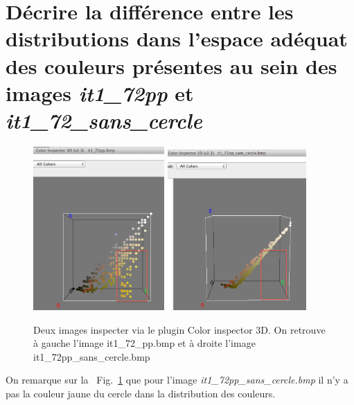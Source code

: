 \documentclass[a4paper,10pt]{article}
\begin{document}
\newpage

\section{D\'ecrire la diff\'erence entre les distributions dans l'espace ad\'equat des couleurs pr\'esentes au sein des images \emph{it1\_72pp} et \emph{it1\_72\_sans\_cercle}}

\begin{figure}[ht]
\begin{center}
	\includegraphics[width=5cm]{images/it1_72pp}
	\includegraphics[width=5.3cm]{images/it1_72pp_sans_cercle}
\end{center}
	\caption{Deux images inspecter via le plugin Color inspector 3D. On retrouve \`a gauche l'image it1\_72\_pp.bmp et \`a droite l'image it1\_72pp\_sans\_cercle.bmp}
	\label{img5}
\end{figure}

On remarque sur la ~Fig.~\ref{img5} que pour l'image \emph{it1\_72pp\_sans\_cercle.bmp} il n'y a pas la couleur jaune du cercle dans la distribution des couleurs.
\end{document}
